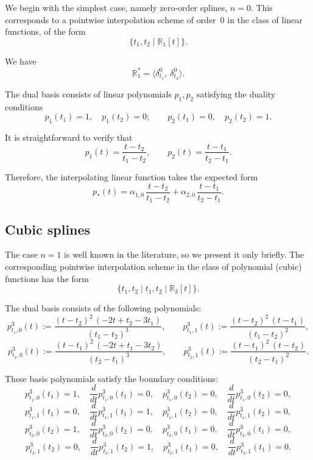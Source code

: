 \documentclass{article}
\theoremstyle{definition}
\theoremstyle{definition}
\numberwithin{figure}{section}
\newcommand{\1}{\mathbf{1}}
\begin{document}
We begin with the simplest case, namely zero-order splines, $n = 0$.  
This corresponds to a pointwise interpolation scheme of order~0 in the class of linear functions, of the form
\[
    \{t_1, t_2 \mid \mathbb{R}_{1}[t]\}.
\]

We have
\[
    \mathbb{R}^*_{1} = \langle \delta^0_{t_1},\ \delta^0_{t_2} \rangle.
\]

The dual basis consists of linear polynomials $p_1, p_2$ satisfying the duality conditions
\[
    p_1(t_1) = 1,\quad p_1(t_2) = 0;\qquad
    p_2(t_1) = 0,\quad p_2(t_2) = 1.
\]

It is straightforward to verify that
\[
    p_1(t) = \frac{t - t_2}{t_1 - t_2},\qquad
    p_2(t) = \frac{t - t_1}{t_2 - t_1}.
\]

Therefore, the interpolating linear function takes the expected form
\[
    p_*(t)
    =
    \alpha_{1,0}\,\frac{t - t_2}{t_1 - t_2}
    +
    \alpha_{2,0}\,\frac{t - t_1}{t_2 - t_1}.
\]

\subsection{Cubic splines}

The case $n = 1$ is well known in the literature, so we present it only briefly.  
The corresponding pointwise interpolation scheme in the class of polynomial (cubic) functions has the form
\begin{equation}\label{eq-schemecubic}
    \{t_1, t_2 \mid t_1, t_2 \mid \mathbb{R}_{3}[t]\}.
\end{equation}

The dual basis consists of the following polynomials:
\[
    p^{3}_{t_1,0}(t)
    :=
    \frac{(t - t_2)^2\,(-2t + t_2 - 3t_1)}{(t_1 - t_2)^3},
    \qquad
    p^{3}_{t_1,1}(t)
    :=
    \frac{(t - t_2)^2\,(t - t_1)}{(t_1 - t_2)^2},
\]
\[
    p^{3}_{t_2,0}(t)
    :=
    \frac{(t - t_1)^2\,(-2t + t_1 - 3t_2)}{(t_2 - t_1)^3},
    \qquad
    p^{3}_{t_2,1}(t)
    :=
    \frac{(t - t_1)^2\,(t - t_2)}{(t_2 - t_1)^2}.
\]

These basis polynomials satisfy the boundary conditions:
\[
    p^{3}_{t_1,0}(t_1) = 1,\quad 
    \frac{d}{dt}p^{3}_{t_1,0}(t_1) = 0,\quad
    p^{3}_{t_1,0}(t_2) = 0,\quad
    \frac{d}{dt}p^{3}_{t_1,0}(t_2) = 0,
\]
\[
    p^{3}_{t_1,1}(t_1) = 0,\quad 
    \frac{d}{dt}p^{3}_{t_1,1}(t_1) = 1,\quad
    p^{3}_{t_1,1}(t_2) = 0,\quad
    \frac{d}{dt}p^{3}_{t_1,1}(t_2) = 0,
\]
\[
    p^{3}_{t_2,0}(t_2) = 1,\quad 
    \frac{d}{dt}p^{3}_{t_2,0}(t_2) = 0,\quad
    p^{3}_{t_2,0}(t_1) = 0,\quad
    \frac{d}{dt}p^{3}_{t_2,0}(t_1) = 0,
\]
\[
    p^{3}_{t_2,1}(t_2) = 0,\quad 
    \frac{d}{dt}p^{3}_{t_2,1}(t_2) = 1,\quad
    p^{3}_{t_2,1}(t_1) = 0,\quad
    \frac{d}{dt}p^{3}_{t_2,1}(t_1) = 0.
\]
\end{document}
